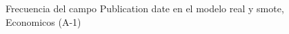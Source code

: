 \begin{figure}[H]
    \centering
    
    \caption{Frecuencia del campo Publication date en el modelo real y smote, Economicos (A-1)}
    \label{frecuency-Publication Date-smote-enc}
\end{figure}